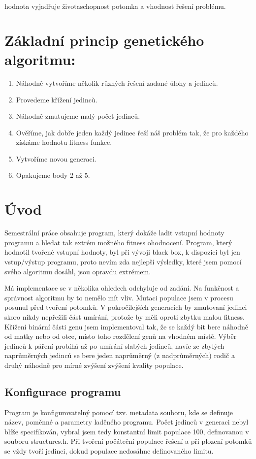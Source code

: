 \documentclass{article}
\begin{document}
hodnota vyjadřuje životaschopnost potomka a vhodnost řešení problému.
\section{Základní princip genetického algoritmu:}
\begin{enumerate}
\item Náhodně vytvoříme několik různých řešení zadané úlohy a jedincù.
\item Provedeme křížení jedincù.
\item Náhodně zmutujeme malý počet jedinců.
\item Ověříme, jak dobře jeden každý jedinec řeší náš problém tak, že pro každého získáme hodnotu fitness funkce.
\item Vytvoříme novou generaci.
\item Opakujeme body 2 až 5. \ 
\end{enumerate}


\section{Úvod}

Semestrální práce obsahuje program, který dokáže ladit vstupní hodnoty programu a hledat tak extrém možného fitness ohodnocení. Program, který hodnotil tvořené vstupní hodnoty, byl při vývoji black box, k dispozici byl jen vstup/výstup programu, proto nevím zda nejlepší výsledky, které jsem pomocí svého algoritmu dosáhl, jsou opravdu extrémem. 



Má implementace se v několika ohledech odchyluje od zadání. Na funkčnost a správnost algoritmu by to nemělo mít vliv. Mutaci populace jsem v procesu posunul před tvoření potomků. V pokročilejších generacích by zmutovaní jedinci skoro nikdy nepřežili část umírání, protože by měli oproti zbytku malou fitness. Křížení binární části genu jsem implementoval tak, že se každý bit bere náhodně od matky nebo od otce, místo toho rozdělení genů na vhodném místě. Výběr jedinců k páření probíhá až po umírání slabých jedinců, navíc ze zbylých naprůměrných jedinců se bere jeden naprůměrný (z nadprůměrných) rodič a druhý náhodně pro mírné zvýšení zvýšení kvality populace.


\subsection{Konfigurace programu}

Program je konfigurovatelný pomocí tzv. metadata souboru, kde se definuje název, poměnné a parametry laděného programu. Počet jedinců v generaci nebyl blíže specifikován, vybral jsem tedy konstantní limit populace 100, definovanou v souboru structures.h. Při tvoření počáteční populace řešení a při plození potomků se vždy tvoří jedinci, dokud populace nedosáhne definovaného limitu.
\end{document}
